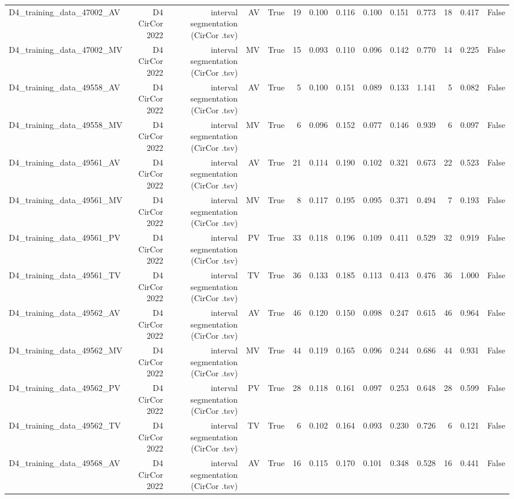 \begin{table}[htbp]
\begin{tabular}{lrrrrrrrrrrrrr}
    D4\_training\_data\_47002\_AV & D4 CirCor 2022 & interval segmentation (CirCor .tsv) & AV & True & 19 & 0.100 & 0.116 & 0.100 & 0.151 & 0.773 & 18 & 0.417 & False \\
    D4\_training\_data\_47002\_MV & D4 CirCor 2022 & interval segmentation (CirCor .tsv) & MV & True & 15 & 0.093 & 0.110 & 0.096 & 0.142 & 0.770 & 14 & 0.225 & False \\
    D4\_training\_data\_49558\_AV & D4 CirCor 2022 & interval segmentation (CirCor .tsv) & AV & True & 5 & 0.100 & 0.151 & 0.089 & 0.133 & 1.141 & 5 & 0.082 & False \\
    D4\_training\_data\_49558\_MV & D4 CirCor 2022 & interval segmentation (CirCor .tsv) & MV & True & 6 & 0.096 & 0.152 & 0.077 & 0.146 & 0.939 & 6 & 0.097 & False \\
    D4\_training\_data\_49561\_AV & D4 CirCor 2022 & interval segmentation (CirCor .tsv) & AV & True & 21 & 0.114 & 0.190 & 0.102 & 0.321 & 0.673 & 22 & 0.523 & False \\
    D4\_training\_data\_49561\_MV & D4 CirCor 2022 & interval segmentation (CirCor .tsv) & MV & True & 8 & 0.117 & 0.195 & 0.095 & 0.371 & 0.494 & 7 & 0.193 & False \\
    D4\_training\_data\_49561\_PV & D4 CirCor 2022 & interval segmentation (CirCor .tsv) & PV & True & 33 & 0.118 & 0.196 & 0.109 & 0.411 & 0.529 & 32 & 0.919 & False \\
    D4\_training\_data\_49561\_TV & D4 CirCor 2022 & interval segmentation (CirCor .tsv) & TV & True & 36 & 0.133 & 0.185 & 0.113 & 0.413 & 0.476 & 36 & 1.000 & False \\
    D4\_training\_data\_49562\_AV & D4 CirCor 2022 & interval segmentation (CirCor .tsv) & AV & True & 46 & 0.120 & 0.150 & 0.098 & 0.247 & 0.615 & 46 & 0.964 & False \\
    D4\_training\_data\_49562\_MV & D4 CirCor 2022 & interval segmentation (CirCor .tsv) & MV & True & 44 & 0.119 & 0.165 & 0.096 & 0.244 & 0.686 & 44 & 0.931 & False \\
    D4\_training\_data\_49562\_PV & D4 CirCor 2022 & interval segmentation (CirCor .tsv) & PV & True & 28 & 0.118 & 0.161 & 0.097 & 0.253 & 0.648 & 28 & 0.599 & False \\
    D4\_training\_data\_49562\_TV & D4 CirCor 2022 & interval segmentation (CirCor .tsv) & TV & True & 6 & 0.102 & 0.164 & 0.093 & 0.230 & 0.726 & 6 & 0.121 & False \\
    D4\_training\_data\_49568\_AV & D4 CirCor 2022 & interval segmentation (CirCor .tsv) & AV & True & 16 & 0.115 & 0.170 & 0.101 & 0.348 & 0.528 & 16 & 0.441 & False \\

\end{tabular}
\end{table}
